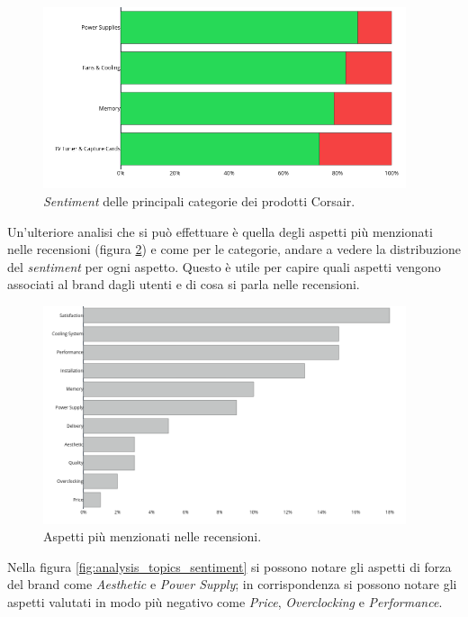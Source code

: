 \begin{figure}[ht]
  \centering
  \includegraphics[width=0.95\textwidth]{images/analysis/sentiment_categories.png}
  \caption{\textit{Sentiment} delle principali categorie dei prodotti Corsair.}
  \label{fig:analysis_sentiment_category}
\end{figure}

Un'ulteriore analisi che si può effettuare è quella degli aspetti più menzionati nelle recensioni (figura \ref{fig:analysis_topics}) e come per le categorie, andare a vedere la distribuzione del \textit{sentiment} per ogni aspetto.  
Questo è utile per capire quali aspetti vengono associati al brand dagli utenti e di cosa si parla nelle recensioni.

\begin{figure}[ht]
  \centering
  \includegraphics[width=0.95\textwidth]{images/analysis/topics.png}
  \caption{Aspetti più menzionati nelle recensioni.}
  \label{fig:analysis_topics}
\end{figure}

Nella figura \ref{fig:analysis_topics_sentiment} si possono notare gli aspetti di forza del brand come \textit{Aesthetic} e \textit{Power Supply}; in corrispondenza si possono notare gli aspetti valutati in modo più negativo come \textit{Price}, \textit{Overclocking} e \textit{Performance}. 

